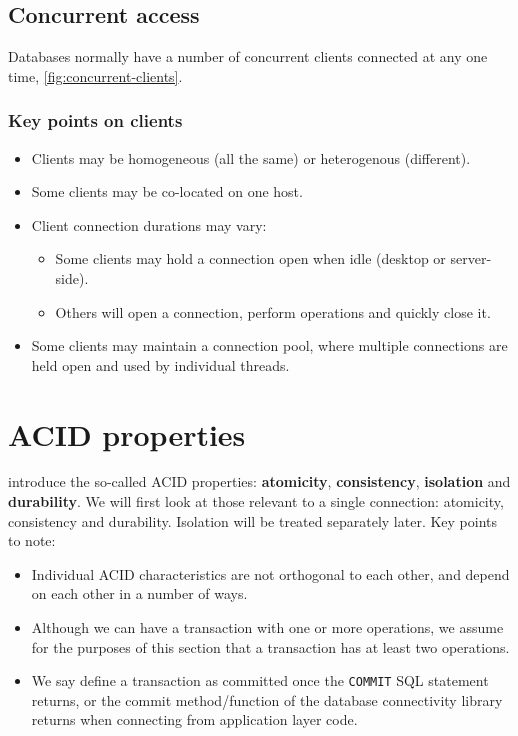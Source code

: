 \documentclass{pgnotes}
\begin{document}
\subsection{Concurrent access}

Databases normally have a number of concurrent clients connected at any one time, \autoref{fig:concurrent-clients}.


\subsubsection{Key points on clients}

\begin{itemize}
\item Clients may be homogeneous (all the same) or heterogenous (different).
\item Some clients may be co-located on one host.
\item Client connection durations may vary:
  \begin{itemize}
  \item Some clients may hold a connection open when idle (desktop or server-side).
  \item Others will open a connection, perform operations and quickly close it.
  \end{itemize}
\item Some clients may maintain a connection pool, where multiple connections are held open and used by individual threads.
\end{itemize}


\section{ACID properties}

\citet{haerder:1983:principles} introduce the so-called ACID properties: \textbf{atomicity}, \textbf{consistency}, \textbf{isolation} and \textbf{durability}.
We will first look at those relevant to a single connection: atomicity, consistency and durability.
Isolation will be treated separately later. Key points to note:
\begin{itemize}
\item Individual ACID characteristics are not orthogonal to each other, and depend on each other in a number of ways.
\item Although we can have a transaction with one or more operations, we assume for the purposes of this section that a transaction has at least two operations. 
\item We say define a transaction as committed once the  \texttt{COMMIT} SQL statement returns, or the commit method/function of the database connectivity library returns when connecting from application layer code.
\end{itemize}
\end{document}
